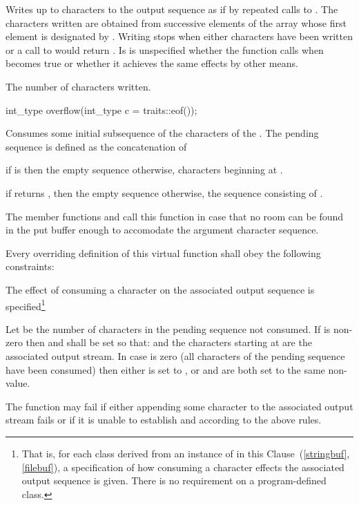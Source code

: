 \begin{itemdescr}
\pnum
\effects
Writes up to  characters to the output sequence as if
by repeated calls to
.
The characters written are obtained from successive elements of
the array whose first element is designated by .
Writing stops when either  characters have been written or
a call to
would return
.
Is is unspecified whether the function calls  when  becomes true or whether it achieves the same effects by other means.

\pnum
\returns
The number of characters written.

%
\begin{itemdecl}
int_type overflow(int_type c = traits::eof());
\end{itemdecl}

\pnum
\effects
Consumes some initial subsequence of the characters of the
.
The pending sequence is defined as the concatenation of
\begin{enumeratea}
\item
if
is
then the empty sequence
otherwise,
characters beginning at
.
\item
if
returns
,
then the empty sequence
otherwise, the sequence consisting of .
\end{enumeratea}

\pnum
\notes
The member functions
and
call this function in case that
no room can be found in the put buffer enough to accomodate the
argument character sequence.

\pnum
\requires
Every overriding definition of this virtual function
shall obey the following constraints:
\begin{enumeraten}
\item
The effect of consuming a character on the associated output sequence is
specified\footnote{That is, for each class derived from an instance of
in this Clause~(\ref{stringbuf},
\ref{filebuf}),
a specification of how consuming a character effects the associated output sequence is given.
There is no requirement on a program-defined class.}
\item
Let
be the number of characters in the pending sequence not consumed.
If
is non-zero then
and
shall be set so that:
and the  characters starting at
are the associated output stream.
In case   is zero (all characters of the pending sequence have been consumed)
then either
is set to
,
or
and
are both set to the same
non-value.
\item
The function may fail if either
appending some character to the associated output stream fails or
if it is unable to establish
and
according to the above rules.
\end{enumeraten}


\end{itemdescr}
